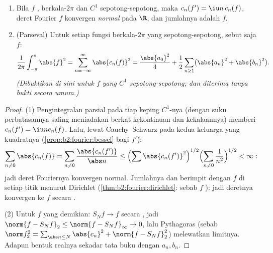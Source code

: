 \begin{theorem}\label{thm:b2:fourier:parseval}
\begin{enumerate}
  \item Bila $f$ , berkala-$2\pi$ dan $C^1$ sepotong-sepotong,
        maka $c_n(f') = \iu n\,c_n(f)$, deret Fourier $f$
        konvergen \emph{normal} pada $\R$, dan jumlahnya adalah $f$.
  \item (Parseval) Untuk setiap fungsi berkala-$2\pi$ yang 
        sepotong-sepotong, sebut saja $f$:
        \[
        \frac{1}{2\pi}\int_{-\pi}^{\pi}\abs{f}^2
        = \sum_{n=-\infty}^{\infty} \abs{c_n(f)}^2
        = \frac{\abs{a_0}^2}{4} + \frac12\sum_{n\geq1}
        \bigl(\abs{a_n}^2 + \abs{b_n}^2\bigr).
        \]
        \emph{(Dibuktikan di sini untuk $f$  yang $C^1$
        sepotong-sepotong; dan diterima tanpa bukti secara umum.)}
\end{enumerate}
\end{theorem}

\begin{proof}
(1) Pengintegralan parsial pada tiap keping $C^1$-nya (dengan suku
perbatasannya saling meniadakan berkat kekontinuan dan kekalaannya) memberi
$c_n(f') = \iu n c_n(f)$. Lalu, lewat Cauchy--Schwarz pada kedua keluarga
yang  kuadratnya (\cref{prop:b2:fourier:bessel} bagi $f'$):
\[
\sum_{n \neq 0} \abs{c_n(f)} = \sum_{n\neq0}
\frac{\abs{c_n(f')}}{\abs n}
\leq \Bigl(\sum \abs{c_n(f')}^2\Bigr)^{1/2}
\Bigl(\sum_{n\neq0}\frac{1}{n^2}\Bigr)^{1/2} < \infty :
\]
jadi deret Fouriernya konvergen normal. Jumlahnya  dan
berimpit dengan $f$ di setiap titik menurut Dirichlet
(\cref{thm:b2:fourier:dirichlet}: sebab $f$ ): jadi deretnya
konvergen ke $f$ secara .

(2) Untuk $f$ yang demikian: $S_N f \to f$ secara , jadi $\norm{f - S_Nf}_2
\leq \norm{f - S_Nf}_\infty \to 0$, lalu Pythagoras
(sebab $\norm f_2^2 = \sum_{\abs n \leq N}\abs{c_n}^2 + \norm{f -
S_Nf}_2^2$) melewatkan limitnya. Adapun bentuk realnya sekadar tata buku dengan
$a_n, b_n$.
\end{proof}

